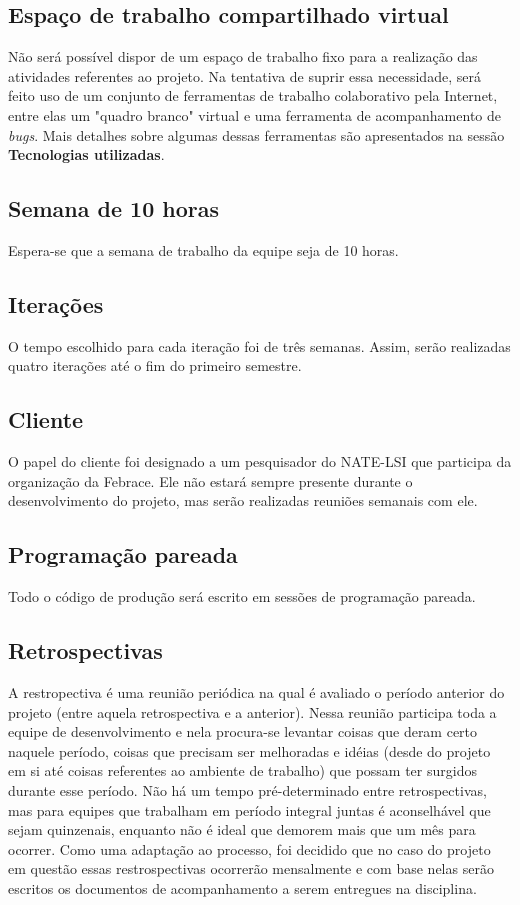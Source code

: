 \documentclass[a4paper,12pt,font=plain,header=plain]{abnt}
\begin{document}
	\subsection{Espaço de trabalho compartilhado virtual}
		Não será possível dispor de um espaço de trabalho fixo para a realização das atividades referentes ao projeto. Na tentativa de suprir essa necessidade, será feito uso de um conjunto de ferramentas de trabalho colaborativo pela Internet, entre elas um "quadro branco" virtual e uma ferramenta de acompanhamento de \textit{bugs}. Mais detalhes sobre algumas dessas ferramentas são apresentados na sessão \textbf{Tecnologias utilizadas}.
	
	\subsection{Semana de 10 horas}
		Espera-se que a semana de trabalho da equipe seja de 10 horas.
	
	\subsection{Iterações}
		O tempo escolhido para cada iteração foi de três semanas. Assim, serão realizadas quatro iterações até o fim do primeiro semestre.
	
	\subsection{Cliente}
		O papel do cliente foi designado a um pesquisador do NATE-LSI que participa da organização da Febrace. Ele não estará sempre presente durante o desenvolvimento do projeto, mas serão realizadas reuniões semanais com ele.
	
	\subsection{Programação pareada}
		Todo o código de produção será escrito em sessões de programação pareada.
	
	\subsection{Retrospectivas}
		A restropectiva é uma reunião periódica na qual é avaliado o período anterior do projeto (entre aquela retrospectiva e a anterior). Nessa reunião participa toda a equipe de desenvolvimento e nela procura-se levantar coisas que deram certo naquele período, coisas que precisam ser melhoradas e idéias (desde do projeto em si até coisas referentes ao ambiente de trabalho) que possam ter surgidos durante esse período. Não há um tempo pré-determinado entre retrospectivas, mas para equipes que trabalham em período integral juntas é aconselhável que sejam quinzenais, enquanto não é ideal que demorem mais que um mês para ocorrer. Como uma adaptação ao processo, foi decidido que no caso do projeto em questão essas restrospectivas ocorrerão mensalmente e com base nelas serão escritos os documentos de acompanhamento a serem entregues na disciplina.
	
\end{document}
